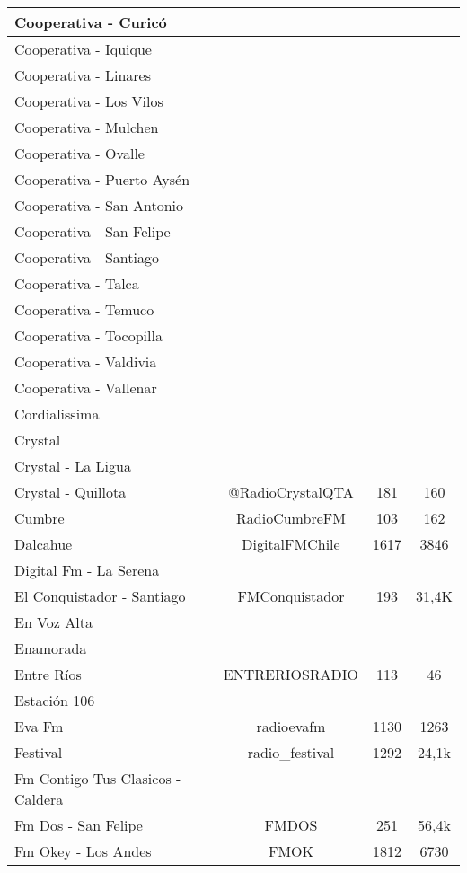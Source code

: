 \begin{center}
\begin{longtable}{| l | c | c | c |}
Cooperativa - Curicó	&		&		&		\\ \hline
Cooperativa - Iquique	&		&		&		\\ \hline
Cooperativa - Linares	&		&		&		\\ \hline
Cooperativa - Los Vilos	&		&		&		\\ \hline
Cooperativa - Mulchen	&		&		&		\\ \hline
Cooperativa - Ovalle	&		&		&		\\ \hline
Cooperativa - Puerto Aysén	&		&		&		\\ \hline
Cooperativa - San Antonio	&		&		&		\\ \hline
Cooperativa - San Felipe	&		&		&		\\ \hline
Cooperativa - Santiago	&		&		&		\\ \hline
Cooperativa - Talca	&		&		&		\\ \hline
Cooperativa - Temuco	&		&		&		\\ \hline
Cooperativa - Tocopilla	&		&		&		\\ \hline
Cooperativa - Valdivia	&		&		&		\\ \hline
Cooperativa - Vallenar	&		&		&		\\ \hline
Cordialissima	&		&		&		\\ \hline
Crystal	&		&		&		\\ \hline
Crystal - La Ligua	&		&		&		\\ \hline
Crystal - Quillota	&	@RadioCrystalQTA	&	181	&	160	\\ \hline
Cumbre	&	RadioCumbreFM	&	103	&	162	\\ \hline
Dalcahue	&	DigitalFMChile	&	1617	&	3846	\\ \hline
Digital Fm - La Serena	&		&		&		\\ \hline
El Conquistador - Santiago	&	FMConquistador	&	193	&	31,4K	\\ \hline
En Voz Alta	&		&		&		\\ \hline
Enamorada	&		&		&		\\ \hline
Entre Ríos	&	ENTRERIOSRADIO	&	113	&	46	\\ \hline
Estación 106	&		&		&		\\ \hline
Eva Fm	&	radioevafm	&	1130	&	1263	\\ \hline
Festival	&	radio\_festival	&	1292	&	24,1k	\\ \hline
Fm Contigo Tus Clasicos - Caldera	&		&		&		\\ \hline
Fm Dos - San Felipe	&	FMDOS	&	251	&	56,4k	\\ \hline
Fm Okey - Los Andes	&	FMOK	&	1812	&	6730	\\ \hline

\end{longtable}
\end{center}
